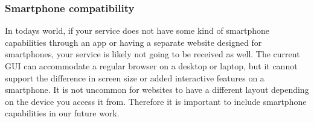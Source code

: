 \subsubsection{Smartphone compatibility}
In todays world, if your service does not have some kind of smartphone capabilities through an app or having a separate website designed for smartphones, your service is likely not going to be received as well. The current GUI can accommodate a regular browser on a desktop or laptop, but it cannot support the difference in screen size or added interactive features on a smartphone. It is not uncommon for websites to have a different layout depending on the device you access it from. Therefore it is important to include smartphone capabilities in our future work.
